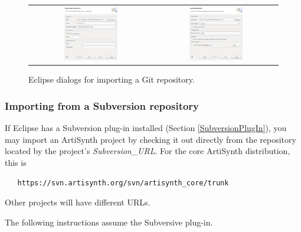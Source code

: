 \begin{figure}
\begin{center}
\begin{tabular}{cc}
\else
   \includegraphics[width=0.45\textwidth]{images/EclipseSourceGitRepository} &
   \includegraphics[width=0.45\textwidth]{images/EclipseLocalDestination}
\fi   
\end{tabular}
\end{center}
\caption{Eclipse dialogs for importing a Git repository.}%
\label{EclipseGitImport:fig}
\end{figure}

\subsubsection{Importing from a Subversion repository}
\label{importingFromSubversion}

If Eclipse has a Subversion plug-in installed (Section
\ref{SubversionPlugIn}), you may import an ArtiSynth project by
checking it out directly from the repository located by
the project's {\it Subversion\_URL}. For the core ArtiSynth
distribution, this is 
\begin{verbatim}
   https://svn.artisynth.org/svn/artisynth_core/trunk
\end{verbatim}
Other projects will have different URLs.

The following instructions assume the Subversive plug-in.

